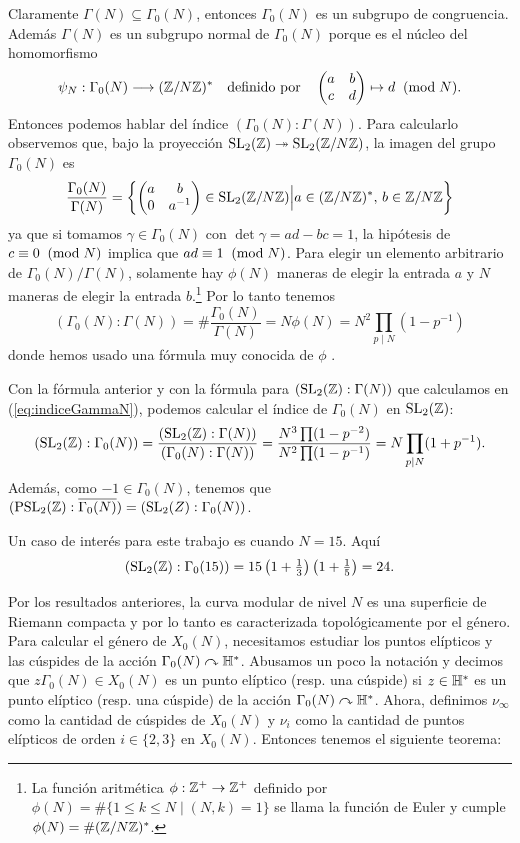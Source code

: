 \documentclass[../../tesis_maestria]{subfiles}
\begin{document}
Claramente $\Gamma(N)\subseteq\Gamma_0(N)$, entonces $\Gamma_0(N)$ es un subgrupo de congruencia.
Adem\'as $\Gamma(N)$ es un subgrupo normal de $\Gamma_0(N)$ porque es el n\'ucleo del homomorfismo
\[
  \psi_N:\Gamma_0(N)\longrightarrow(\mathbb{Z}/N\mathbb{Z})^*\quad\text{definido por}\quad \begin{pmatrix}a & b\\ c & d\end{pmatrix}\mapsto d\;\;(\mathrm{mod}\; N).
\]
Entonces podemos hablar del \'indice $(\Gamma_0(N):\Gamma(N))$. Para calcularlo observemos que,
bajo la proyecci\'on $\mathrm{SL}_2(\mathbb{Z})\twoheadrightarrow\mathrm{SL}_2(\mathbb{Z}/N\mathbb{Z})$, la imagen del grupo $\Gamma_0(N)$ es
\[
  \frac{\Gamma_0(N)}{\Gamma(N)}=
  \left\{ \begin{pmatrix}a & b\\ 0 & a^{-1}\end{pmatrix}\in\mathrm{SL}_2(\mathbb{Z}/N\mathbb{Z}) \Big| a\in(\mathbb{Z}/N\mathbb{Z})^*,\, b\in\mathbb{Z}/N\mathbb{Z}\right\}
\]
ya que si tomamos $\gamma\in\Gamma_0(N)$ con $\det\gamma=ad-bc=1$, la hip\'otesis de
$c\equiv0\;\;(\mathrm{mod}\; N)$ implica que $ad\equiv1\;\;(\mathrm{mod}\; N)$. Para elegir un elemento arbitrario de
$\Gamma_0(N)/\Gamma(N)$,  solamente hay $\phi(N)$ maneras de elegir la entrada $a$ y  $N$ maneras de
elegir la entrada $b$.\footnote{La funci\'on aritm\'etica
  $\phi:\mathbb{Z}^+\rightarrow\mathbb{Z}^+$ definido por $\phi(N)=\#\{1\leq k\leq N\mid (N,k)=1\}$ se llama la funci\'on
  de Euler y cumple $\phi(N)=\#(\mathbb{Z}/N\mathbb{Z})^*$.} Por lo tanto tenemos
\[
  (\Gamma_0(N):\Gamma(N))=\#\frac{\Gamma_0(N)}{\Gamma(N)}=N\phi(N)=N^2\prod_{p\mid N}(1-p^{-1})
\]
donde hemos usado una f\'ormula muy conocida de $\phi$
\cite[Proposici\'on 2.2.5]{IrelandRosenACITMNT}.

Con la f\'ormula anterior y con la f\'ormula para $(\mathrm{SL}_2(\mathbb{Z}):\Gamma(N))$ que calculamos en
(\ref{eq:indiceGammaN}), podemos calcular el \'indice de $\Gamma_0(N)$ en $\mathrm{SL}_2(\mathbb{Z})$:
\[
  (\mathrm{SL}_2(\mathbb{Z}):\Gamma_0(N))=
  \frac{(\mathrm{SL}_2(\mathbb{Z}):\Gamma(N))}{(\Gamma_0(N):\Gamma(N))}=
  \frac{N^3\prod (1-p^{-2})}{N^2\prod(1-p^{-1})}=N\prod_{p\mid N}(1+p^{-1}).
\]
Adem\'as, como $-1\in\Gamma_0(N)$, tenemos que $(\mathrm{PSL}_2(\mathbb{Z}):\overline{\Gamma_0(N)})=(\mathrm{SL}_2(Z):\Gamma_0(N))$.

\begin{ejemplo}\label{ej:indicequince}
  Un caso de inter\'es para este trabajo es cuando $N=15$. Aqu\'i
  \[
    (\mathrm{SL}_2(\mathbb{Z}):\Gamma_0(15))=15\left( 1+\tfrac{1}{3} \right)\left( 1+\tfrac{1}{5} \right)=24.
  \]
\end{ejemplo}

Por los resultados anteriores, la curva modular de nivel $N$ es una superficie de Riemann compacta
y por lo tanto es caracterizada topol\'ogicamente por el g\'enero. Para calcular el g\'enero de
$X_0(N)$, necesitamos estudiar los puntos el\'ipticos y las c\'uspides de la acci\'on
$\Gamma_0(N)\curvearrowright\mathbb{H}^*$. Abusamos un poco la notaci\'on y decimos que $z\Gamma_0(N)\in X_0(N)$ es un
punto el\'iptico (resp. una c\'uspide) si $z\in\mathbb{H}^*$ es un punto el\'iptico (resp. una c\'uspide)
de la acci\'on $\Gamma_0(N)\curvearrowright\mathbb{H}^*$. Ahora, definimos $\nu_{\infty}$ como la cantidad de c\'uspides
de $X_0(N)$ y $\nu_i$ como la cantidad de puntos el\'ipticos de orden $i\in\{2,3\}$ en $X_0(N)$.
Entonces tenemos el siguiente teorema:
\end{document}
